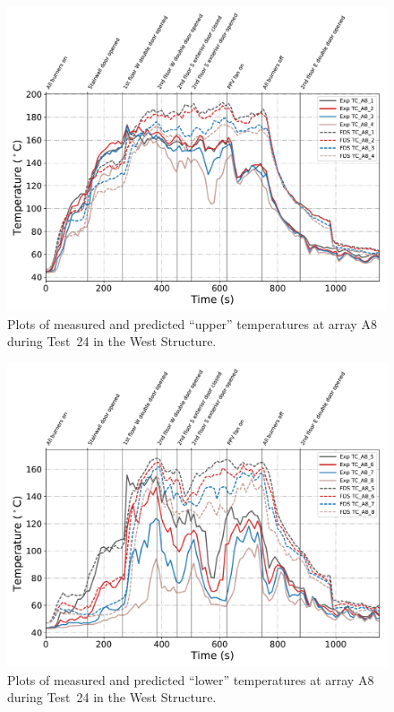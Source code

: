 \begin{figure}[!h]
	\centering
	\includegraphics[width=\columnwidth]{Figures/Plots/Validation/Temperature/Test_24_TC_A8_upper}
	\caption{Plots of measured and predicted ``upper'' temperatures at array A8 during Test~24 in the West Structure.}
	\label{fig:TCA8_upper_data_Test24}
\end{figure}

\begin{figure}[!h]
	\centering
	\includegraphics[width=\columnwidth]{Figures/Plots/Validation/Temperature/Test_24_TC_A8_lower}
	\caption{Plots of measured and predicted ``lower'' temperatures at array A8 during Test~24 in the West Structure.}
	\label{fig:TCA8_lower_data_Test24}
\end{figure}

